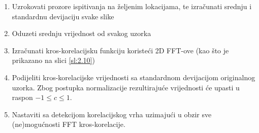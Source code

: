 \begin{enumerate}[label=\textbf{Korak \arabic*:}, leftmargin=*, align=left, topsep=0pt, itemsep=0em]
	\item Uzrokovati prozore ispitivanja na željenim lokacijama, te izračunati srednju i standardnu devijaciju svake slike
	\item Oduzeti srednju vrijednost od svakog uzorka
	\item Izračunati kros-korelacijsku funkciju koristeći 2D FFT-ove (kao što je prikazano na slici \ref{sl:2.10})
	\item Podijeliti kros-korelacijske vrijednosti sa standardnom devijacijom originalnog uzorka. Zbog postupka normalizacije rezultirajuće vrijednosti će upasti u raspon $-1\leq c\leq 1$.
	\item Nastaviti sa detekcijom korelacijskog vrha uzimajući u obzir sve (ne)mogućnosti FFT kros-korelacije.
\end{enumerate}
